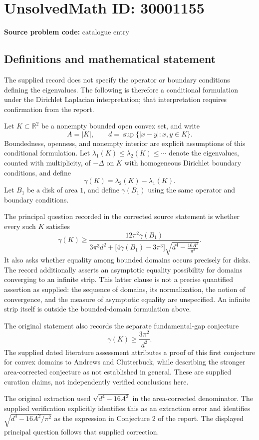 \documentclass[11pt]{article}
\newcommand{\R}{\mathbb{R}}
\begin{document}
\section*{UnsolvedMath ID: 30001155}
\textbf{Source problem code:} catalogue entry
\subsection{Definitions and mathematical statement}
The supplied record does not specify the operator or boundary conditions defining the eigenvalues. The following is therefore a conditional formulation under the Dirichlet Laplacian interpretation; that interpretation requires confirmation from the report.

Let \(K\subset\R^2\) be a nonempty bounded open convex set, and write
\[
A=|K|,\qquad d=\sup\{|x-y|:x,y\in K\}.
\]
Boundedness, openness, and nonempty interior are explicit assumptions of this conditional formulation. Let \(\lambda_1(K)\leq\lambda_2(K)\leq\cdots\) denote the eigenvalues, counted with multiplicity, of \(-\Delta\) on \(K\) with homogeneous Dirichlet boundary conditions, and define
\[
\gamma(K)=\lambda_2(K)-\lambda_1(K).
\]
Let \(B_1\) be a disk of area \(1\), and define \(\gamma(B_1)\) using the same operator and boundary conditions.

The principal question recorded in the corrected source statement is whether every such \(K\) satisfies
\[
\gamma(K)\geq
\frac{12\pi^2\gamma(B_1)}{
3\pi^3d^2+
\bigl[4\gamma(B_1)-3\pi^3\bigr]
\sqrt{d^4-\frac{16A^2}{\pi^2}}
}.
\]
It also asks whether equality among bounded domains occurs precisely for disks. The record additionally asserts an asymptotic equality possibility for domains converging to an infinite strip. This latter clause is not a precise quantified assertion as supplied: the sequence of domains, its normalization, the notion of convergence, and the measure of asymptotic equality are unspecified. An infinite strip itself is outside the bounded-domain formulation above.

The original statement also records the separate fundamental-gap conjecture
\[
\gamma(K)\geq\frac{3\pi^2}{d^2}.
\]
The supplied dated literature assessment attributes a proof of this first conjecture for convex domains to Andrews and Clutterbuck, while describing the stronger area-corrected conjecture as not established in general. These are supplied curation claims, not independently verified conclusions here.

The original extraction used \(\sqrt{d^4-16A^2}\) in the area-corrected denominator. The supplied verification explicitly identifies this as an extraction error and identifies \(\sqrt{d^4-16A^2/\pi^2}\) as the expression in Conjecture 2 of the report. The displayed principal question follows that supplied correction.
\end{document}
